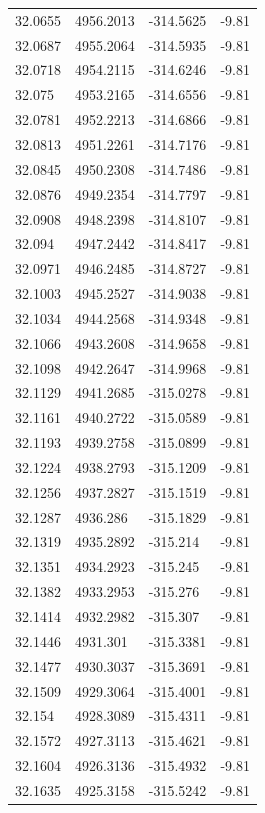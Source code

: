 \begin{table}[H]
\begin{tabular}{llll}
32.0655 & 4956.2013 & -314.5625 & -9.81 \\
32.0687 & 4955.2064 & -314.5935 & -9.81 \\
32.0718 & 4954.2115 & -314.6246 & -9.81 \\
32.075 & 4953.2165 & -314.6556 & -9.81 \\
32.0781 & 4952.2213 & -314.6866 & -9.81 \\
32.0813 & 4951.2261 & -314.7176 & -9.81 \\
32.0845 & 4950.2308 & -314.7486 & -9.81 \\
32.0876 & 4949.2354 & -314.7797 & -9.81 \\
32.0908 & 4948.2398 & -314.8107 & -9.81 \\
32.094 & 4947.2442 & -314.8417 & -9.81 \\
32.0971 & 4946.2485 & -314.8727 & -9.81 \\
32.1003 & 4945.2527 & -314.9038 & -9.81 \\
32.1034 & 4944.2568 & -314.9348 & -9.81 \\
32.1066 & 4943.2608 & -314.9658 & -9.81 \\
32.1098 & 4942.2647 & -314.9968 & -9.81 \\
32.1129 & 4941.2685 & -315.0278 & -9.81 \\
32.1161 & 4940.2722 & -315.0589 & -9.81 \\
32.1193 & 4939.2758 & -315.0899 & -9.81 \\
32.1224 & 4938.2793 & -315.1209 & -9.81 \\
32.1256 & 4937.2827 & -315.1519 & -9.81 \\
32.1287 & 4936.286 & -315.1829 & -9.81 \\
32.1319 & 4935.2892 & -315.214 & -9.81 \\
32.1351 & 4934.2923 & -315.245 & -9.81 \\
32.1382 & 4933.2953 & -315.276 & -9.81 \\
32.1414 & 4932.2982 & -315.307 & -9.81 \\
32.1446 & 4931.301 & -315.3381 & -9.81 \\
32.1477 & 4930.3037 & -315.3691 & -9.81 \\
32.1509 & 4929.3064 & -315.4001 & -9.81 \\
32.154 & 4928.3089 & -315.4311 & -9.81 \\
32.1572 & 4927.3113 & -315.4621 & -9.81 \\
32.1604 & 4926.3136 & -315.4932 & -9.81 \\
32.1635 & 4925.3158 & -315.5242 & -9.81 \\

\end{tabular}
\end{table}
